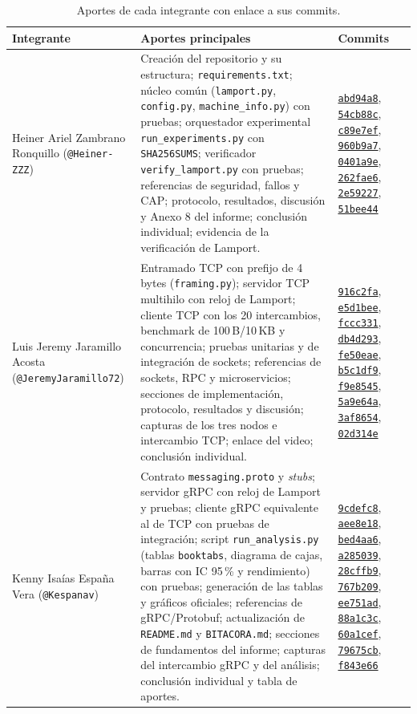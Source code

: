 \documentclass[12pt,a4paper]{article}
\newcommand{\commit}[1]{\href{https://github.com/Heiner-ZZZ/GA-SUM-02-PE-U1-Comunicaci-n-entre-Procesos-Distribuidos-con-gRPC-y-Sockets-TCP/commit/#1}{\texttt{#1}}}
\begin{document}
\begin{table}[htbp]
\centering
\caption{Aportes de cada integrante con enlace a sus commits.}
\label{tab:aportes}
\footnotesize
\setlength{\tabcolsep}{4pt}
\renewcommand{\arraystretch}{1.22}
\begin{tabular}{>{\raggedright\arraybackslash}p{3.4cm}>{\raggedright\arraybackslash}p{7.1cm}>{\raggedright\arraybackslash}p{4.3cm}}
\toprule
Integrante & Aportes principales & Commits \\
\midrule
Heiner Ariel Zambrano Ronquillo (\texttt{@Heiner-ZZZ}) &
Creación del repositorio y su estructura; \texttt{requirements.txt}; núcleo común (\texttt{lamport.py}, \texttt{config.py}, \texttt{machine\_info.py}) con pruebas; orquestador experimental \texttt{run\_experiments.py} con \texttt{SHA256SUMS}; verificador \texttt{verify\_lamport.py} con pruebas; referencias de seguridad, fallos y CAP; protocolo, resultados, discusión y Anexo 8 del informe; conclusión individual; evidencia de la verificación de Lamport. &
\commit{abd94a8}, \commit{54cb88c}, \commit{c89e7ef}, \commit{960b9a7}, \commit{0401a9e}, \commit{262fae6}, \commit{2e59227}, \commit{51bee44} \\
\midrule
Luis Jeremy Jaramillo Acosta (\texttt{@JeremyJaramillo72}) &
Entramado TCP con prefijo de 4 bytes (\texttt{framing.py}); servidor TCP multihilo con reloj de Lamport; cliente TCP con los 20 intercambios, benchmark de 100\,B/10\,KB y concurrencia; pruebas unitarias y de integración de sockets; referencias de sockets, RPC y microservicios; secciones de implementación, protocolo, resultados y discusión; capturas de los tres nodos e intercambio TCP; enlace del video; conclusión individual. &
\commit{916c2fa}, \commit{e5d1bee}, \commit{fccc331}, \commit{db4d293}, \commit{fe50eae}, \commit{b5c1df9}, \commit{f9e8545}, \commit{5a9e64a}, \commit{3af8654}, \commit{02d314e} \\
\midrule
Kenny Isaías España Vera (\texttt{@Kespanav}) &
Contrato \texttt{messaging.proto} y \emph{stubs}; servidor gRPC con reloj de Lamport y pruebas; cliente gRPC equivalente al de TCP con pruebas de integración; script \texttt{run\_analysis.py} (tablas \texttt{booktabs}, diagrama de cajas, barras con IC 95\,\% y rendimiento) con pruebas; generación de las tablas y gráficos oficiales; referencias de gRPC/Protobuf; actualización de \texttt{README.md} y \texttt{BITACORA.md}; secciones de fundamentos del informe; capturas del intercambio gRPC y del análisis; conclusión individual y tabla de aportes. &
\commit{9cdefc8}, \commit{aee8e18}, \commit{bed4aa6}, \commit{a285039}, \commit{28cffb9}, \commit{767b209}, \commit{ee751ad}, \commit{88a1c3c}, \commit{60a1cef}, \commit{79675cb}, \commit{f843e66} \\

\end{tabular}
\end{table}
\end{document}
